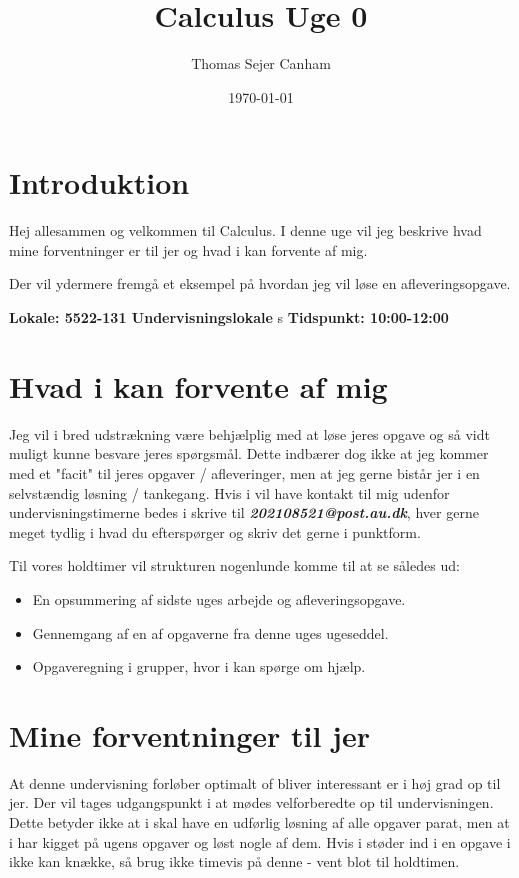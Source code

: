 \documentclass{article}
\title{Calculus Uge 0}
\author{Thomas Sejer Canham}
\date{\today}
\begin{document}
\begin{titlepage}
 \maketitle
 \thispagestyle{empty}
\end{titlepage}

\section*{Introduktion}
Hej allesammen og velkommen til Calculus. I denne uge vil jeg beskrive hvad mine forventninger er til jer og hvad i kan forvente af mig.\vspace{1em}


Der vil ydermere fremgå et eksempel på hvordan jeg vil løse en afleveringsopgave. \vspace{1em}

\textbf{Lokale: 5522-131 Undervisningslokale}
s
\textbf{Tidspunkt: 10:00-12:00}

\section*{Hvad i kan forvente af mig}
Jeg vil i bred udstrækning være behjælplig med at løse jeres opgave og så vidt muligt kunne besvare jeres spørgsmål. Dette indbærer dog ikke at jeg kommer med et "facit" til jeres opgaver / afleveringer, men at jeg gerne bistår jer i en selvstændig løsning / tankegang. \vspace{0em}
Hvis i vil have kontakt til mig udenfor undervisningstimerne bedes i skrive til \textbf{\emph{202108521@post.au.dk}}, hver gerne meget tydlig i hvad du efterspørger og skriv det gerne i punktform.\vspace{1em}

Til vores holdtimer vil strukturen nogenlunde komme til at se således ud:
\begin{itemize}
    \item En opsummering af sidste uges arbejde og afleveringsopgave.
    \item Gennemgang af en af opgaverne fra denne uges ugeseddel.
    \item Opgaveregning i grupper, hvor i kan spørge om hjælp.
\end{itemize}

\section*{Mine forventninger til jer}
At denne undervisning forløber optimalt of bliver interessant er i høj grad op til jer. Der vil tages udgangspunkt i at mødes velforberedte op til undervisningen. Dette betyder ikke at i skal have en udførlig løsning af alle opgaver parat, men at i har kigget på ugens opgaver og løst nogle af dem. Hvis i støder ind i en opgave i ikke kan knække, så brug ikke timevis på denne - vent blot til holdtimen. \vspace{1em}
\end{document}
